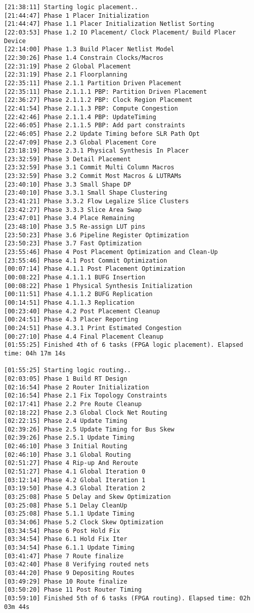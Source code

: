 \begin{lstlisting}[label=some-code-2,caption=Содержимое файла v++\_vinc.log]
[21:38:11] Starting logic placement..
[21:44:47] Phase 1 Placer Initialization
[21:44:47] Phase 1.1 Placer Initialization Netlist Sorting
[22:03:53] Phase 1.2 IO Placement/ Clock Placement/ Build Placer Device
[22:14:00] Phase 1.3 Build Placer Netlist Model
[22:30:26] Phase 1.4 Constrain Clocks/Macros
[22:31:19] Phase 2 Global Placement
[22:31:19] Phase 2.1 Floorplanning
[22:35:11] Phase 2.1.1 Partition Driven Placement
[22:35:11] Phase 2.1.1.1 PBP: Partition Driven Placement
[22:36:27] Phase 2.1.1.2 PBP: Clock Region Placement
[22:41:54] Phase 2.1.1.3 PBP: Compute Congestion
[22:42:46] Phase 2.1.1.4 PBP: UpdateTiming
[22:46:05] Phase 2.1.1.5 PBP: Add part constraints
[22:46:05] Phase 2.2 Update Timing before SLR Path Opt
[22:47:09] Phase 2.3 Global Placement Core
[23:18:19] Phase 2.3.1 Physical Synthesis In Placer
[23:32:59] Phase 3 Detail Placement
[23:32:59] Phase 3.1 Commit Multi Column Macros
[23:32:59] Phase 3.2 Commit Most Macros & LUTRAMs
[23:40:10] Phase 3.3 Small Shape DP
[23:40:10] Phase 3.3.1 Small Shape Clustering
[23:41:21] Phase 3.3.2 Flow Legalize Slice Clusters
[23:42:27] Phase 3.3.3 Slice Area Swap
[23:47:01] Phase 3.4 Place Remaining
[23:48:10] Phase 3.5 Re-assign LUT pins
[23:50:23] Phase 3.6 Pipeline Register Optimization
[23:50:23] Phase 3.7 Fast Optimization
[23:55:46] Phase 4 Post Placement Optimization and Clean-Up
[23:55:46] Phase 4.1 Post Commit Optimization
[00:07:14] Phase 4.1.1 Post Placement Optimization
[00:08:22] Phase 4.1.1.1 BUFG Insertion
[00:08:22] Phase 1 Physical Synthesis Initialization
[00:11:51] Phase 4.1.1.2 BUFG Replication
[00:14:51] Phase 4.1.1.3 Replication
[00:23:40] Phase 4.2 Post Placement Cleanup
[00:24:51] Phase 4.3 Placer Reporting
[00:24:51] Phase 4.3.1 Print Estimated Congestion
[00:27:10] Phase 4.4 Final Placement Cleanup
[01:55:25] Finished 4th of 6 tasks (FPGA logic placement). Elapsed time: 04h 17m 14s 

[01:55:25] Starting logic routing..
[02:03:05] Phase 1 Build RT Design
[02:16:54] Phase 2 Router Initialization
[02:16:54] Phase 2.1 Fix Topology Constraints
[02:17:41] Phase 2.2 Pre Route Cleanup
[02:18:22] Phase 2.3 Global Clock Net Routing
[02:22:15] Phase 2.4 Update Timing
[02:39:26] Phase 2.5 Update Timing for Bus Skew
[02:39:26] Phase 2.5.1 Update Timing
[02:46:10] Phase 3 Initial Routing
[02:46:10] Phase 3.1 Global Routing
[02:51:27] Phase 4 Rip-up And Reroute
[02:51:27] Phase 4.1 Global Iteration 0
[03:12:14] Phase 4.2 Global Iteration 1
[03:19:50] Phase 4.3 Global Iteration 2
[03:25:08] Phase 5 Delay and Skew Optimization
[03:25:08] Phase 5.1 Delay CleanUp
[03:25:08] Phase 5.1.1 Update Timing
[03:34:06] Phase 5.2 Clock Skew Optimization
[03:34:54] Phase 6 Post Hold Fix
[03:34:54] Phase 6.1 Hold Fix Iter
[03:34:54] Phase 6.1.1 Update Timing
[03:41:47] Phase 7 Route finalize
[03:42:40] Phase 8 Verifying routed nets
[03:44:20] Phase 9 Depositing Routes
[03:49:29] Phase 10 Route finalize
[03:50:20] Phase 11 Post Router Timing
[03:59:10] Finished 5th of 6 tasks (FPGA routing). Elapsed time: 02h 03m 44s 


\end{lstlisting}
